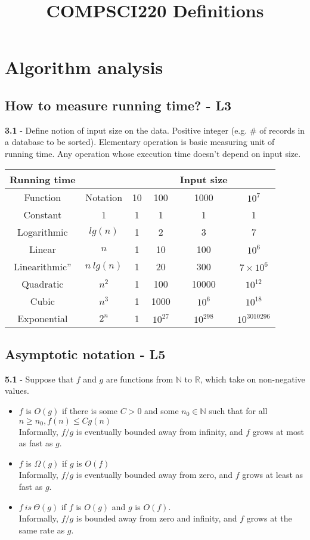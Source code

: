 \documentclass[a4paper]{article}
\begin{document}
\title{COMPSCI220 Definitions}
\date{}
\maketitle


\section{Algorithm analysis}
\subsection*{How to measure running time? - L3}
\textbf{3.1} - Define notion of input size on the data. Positive integer 
(e.g. \# of records in a database to be sorted).  Elementary operation 
is basic measuring unit of running time. Any operation whose execution 
time doesn’t depend on input size. 
\begin{center}
    \begin{tabular}{||c c c c c c||} 
    \hline
    Running time & & & & Input size  \\ [0.5ex] 
    \hline
    Function & Notation & 10 & 100 & 1000 & $10^7$ \\ 
    \hline
    Constant & 1 & 1 & 1 & 1 & 1 \\
    \hline
    Logarithmic & $lg(n)$ & 1 & 2 & 3 & 7 \\
    \hline
    Linear & $n$ & 1 & 10 & 100 & $10^6$ \\
    \hline
    Linearithmic” & $n\ lg(n)$ & 1 & 20 & 300 & $7 \times 10^6$ \\ 
    \hline
    Quadratic & $n^2$ & 1 & 100 & 10000 & $10^{12}$ \\
    \hline
    Cubic & $n^3$ & 1 & 1000 & $10^6$ & $10^{18}$ \\
    \hline
    Exponential & $2^n$ & 1 & $10^{27}$ & $10^{298}$ & $10^{3010296}$ \\ 
    \hline
   \end{tabular}
\end{center}

\subsection*{Asymptotic notation - L5}
\textbf{5.1} - Suppose that $f$ and $g$ are functions from $\mathbb{N}$ to $\mathbb{R}$, which take on
non-negative values.
\begin{itemize}
\item $f$ is $O(g)$ if there is some $C > 0$ and some $n_0 \in \mathbb{N}$ such
that for all $n \geq n_0, f(n) \leq Cg(n)$ \\
Informally, $f/g$ is eventually bounded away from infinity, and $f$ grows at
most as fast as $g$.
\item $f$ is $\Omega (g)$ if $g$ is $O(f)$ \\
Informally, $f/g$ is eventually bounded away from zero, and $f$ grows at least
as fast as $g$.
\item $f\ is\ \Theta(g)$ if $f$ is $O(g)$ and $g$ is $O(f)$.\\
Informally, $f/g$ is bounded away from zero and infinity, and $f$ grows at the
same rate as $g$.
\end{itemize}
\end{document}
